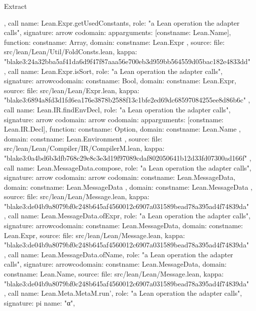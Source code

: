 \begin{lexlean}{Extract}
\begin{toolingmodule}
{{    },
    call{
      name: Lean.Expr.getUsedConstants,
      role: "a Lean operation the adapter calls",
      signature: arrow{
        codomain: app{arguments: [const{name: Lean.Name}], function: const{name: Array}},
        domain: const{name: Lean.Expr}
      },
      source: {
        file: src/lean/Lean/Util/FoldConsts.lean,
        kappa: "blake3:24a32bba5af41da6d9f47f87aaa56e700eb3d959bb564559d05bac182e4833dd"
      }
    },
    call{
      name: Lean.Expr.isSort,
      role: "a Lean operation the adapter calls",
      signature: arrow{codomain: const{name: Bool}, domain: const{name: Lean.Expr}},
      source: {
        file: src/lean/Lean/Expr.lean,
        kappa: "blake3:6894a8fd3d1fd6ea176e3878b2588f13c1bfe2ed69dc68597084255ee8d86b6c"
      }
    },
    call{
      name: Lean.IR.findEnvDecl,
      role: "a Lean operation the adapter calls",
      signature: arrow{
        codomain: arrow{
          codomain: app{arguments: [const{name: Lean.IR.Decl}], function: const{name: Option}},
          domain: const{name: Lean.Name}
        },
        domain: const{name: Lean.Environment}
      },
      source: {
        file: src/lean/Lean/Compiler/IR/CompilerM.lean,
        kappa: "blake3:0a4bd6b3dfb768c29e8c3e3d19f97089cdaf802050641b12d33fd07300ad166f"
      }
    },
    call{
      name: Lean.MessageData.compose,
      role: "a Lean operation the adapter calls",
      signature: arrow{
        codomain: arrow{
          codomain: const{name: Lean.MessageData},
          domain: const{name: Lean.MessageData}
        },
        domain: const{name: Lean.MessageData}
      },
      source: {
        file: src/lean/Lean/Message.lean,
        kappa: "blake3:de04b9a8079bf0c248b645af4560012c6907a031589bead78a395ad4f74839da"
      }
    },
    call{
      name: Lean.MessageData.ofExpr,
      role: "a Lean operation the adapter calls",
      signature: arrow{codomain: const{name: Lean.MessageData}, domain: const{name: Lean.Expr}},
      source: {
        file: src/lean/Lean/Message.lean,
        kappa: "blake3:de04b9a8079bf0c248b645af4560012c6907a031589bead78a395ad4f74839da"
      }
    },
    call{
      name: Lean.MessageData.ofName,
      role: "a Lean operation the adapter calls",
      signature: arrow{codomain: const{name: Lean.MessageData}, domain: const{name: Lean.Name}},
      source: {
        file: src/lean/Lean/Message.lean,
        kappa: "blake3:de04b9a8079bf0c248b645af4560012c6907a031589bead78a395ad4f74839da"
      }
    },
    call{
      name: Lean.Meta.MetaM.run',
      role: "a Lean operation the adapter calls",
      signature: pi{
        name: "α",
}}}
\end{toolingmodule}
\end{lexlean}
